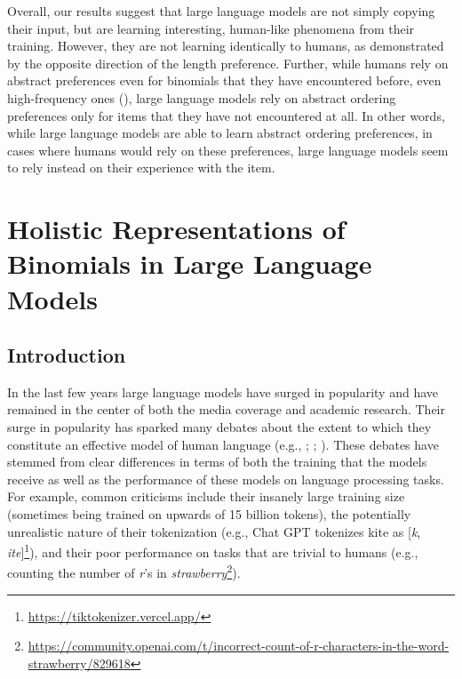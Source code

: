 \documentclass[
  12pt,
  letterpaper,
]{scrreport}
\begin{document}
Overall, our results suggest that large language models are not simply
copying their input, but are learning interesting, human-like phenomena
from their training. However, they are not learning identically to
humans, as demonstrated by the opposite direction of the length
preference. Further, while humans rely on abstract preferences even for
binomials that they have encountered before, even high-frequency ones
(), large language models
rely on abstract ordering preferences only for items that they have not
encountered at all. In other words, while large language models are able
to learn abstract ordering preferences, in cases where humans would rely
on these preferences, large language models seem to rely instead on
their experience with the item.


\chapter{Holistic Representations of Binomials in Large Language
Models}\label{holistic-representations-of-binomials-in-large-language-models}

\section{Introduction}\label{introduction-4}

In the last few years large language models have surged in popularity
and have remained in the center of both the media coverage and academic
research. Their surge in popularity has sparked many debates about the
extent to which they constitute an effective model of human language
(e.g., ; ;
). These debates have stemmed from clear differences in terms of
both the training that the models receive as well as the performance of
these models on language processing tasks. For example, common
criticisms include their insanely large training size (sometimes being
trained on upwards of 15 billion tokens), the potentially unrealistic
nature of their tokenization (e.g., Chat GPT tokenizes kite as
{[}\emph{k}, \emph{ite}{]}\footnote{\url{https://tiktokenizer.vercel.app/}}),
and their poor performance on tasks that are trivial to humans (e.g.,
counting the number of \emph{r}'s in \emph{strawberry}\footnote{\url{https://community.openai.com/t/incorrect-count-of-r-characters-in-the-word-strawberry/829618}}).
\end{document}
